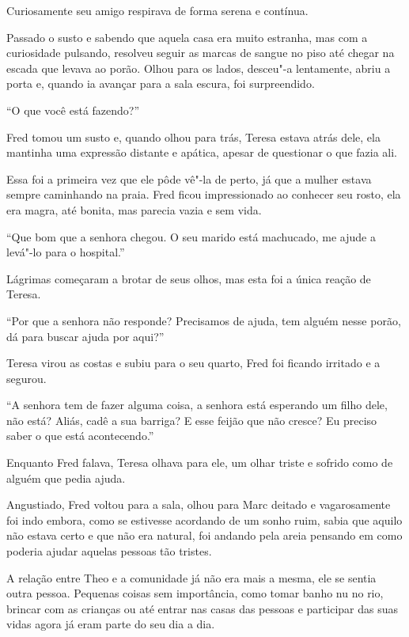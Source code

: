 Curiosamente seu amigo respirava de forma serena e contínua.

Passado o susto e sabendo que aquela casa era muito estranha, mas com a
curiosidade pulsando, resolveu seguir as marcas de sangue no piso até
chegar na escada que levava ao porão. Olhou para os lados, desceu"-a
lentamente, abriu a porta e, quando ia avançar para a sala escura, foi
surpreendido.

``O que você está fazendo?''

Fred tomou um susto e, quando olhou para trás, Teresa estava atrás dele,
ela mantinha uma expressão distante e apática, apesar de questionar o
que fazia ali.

Essa foi a primeira vez que ele pôde vê"-la de perto, já que a mulher
estava sempre caminhando na praia. Fred ficou impressionado ao conhecer
seu rosto, ela era magra, até bonita, mas parecia vazia e sem vida.

``Que bom que a senhora chegou. O seu marido está machucado, me ajude a
levá"-lo para o hospital.''

Lágrimas começaram a brotar de seus olhos, mas esta foi a única reação
de Teresa.

``Por que a senhora não responde? Precisamos de ajuda, tem alguém nesse
porão, dá para buscar ajuda por aqui?''

Teresa virou as costas e subiu para o seu quarto, Fred foi ficando
irritado e a segurou.

``A senhora tem de fazer alguma coisa, a senhora está esperando um filho
dele, não está? Aliás, cadê a sua barriga? E esse feijão que não cresce?
Eu preciso saber o que está acontecendo.''

Enquanto Fred falava, Teresa olhava para ele, um olhar triste e sofrido
como de alguém que pedia ajuda.

Angustiado, Fred voltou para a sala, olhou para Marc deitado e
vagarosamente foi indo embora, como se estivesse acordando de um sonho
ruim, sabia que aquilo não estava certo e que não era natural, foi
andando pela areia pensando em como poderia ajudar aquelas pessoas tão
tristes.

\asterisc


A relação entre Theo e a comunidade já não era mais a mesma, ele se
sentia outra pessoa. Pequenas coisas sem importância, como tomar banho
nu no rio, brincar com as crianças ou até entrar nas casas das pessoas e
participar das suas vidas agora já eram parte do seu dia a dia.

